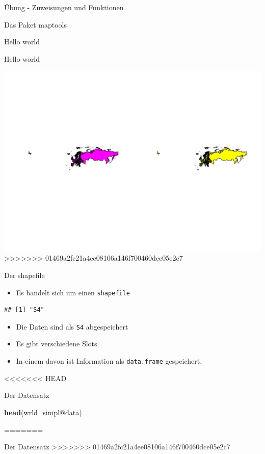 \documentclass[ignorenonframetext,]{beamer}
\newenvironment{Shaded}{\begin{snugshade}}{\end{snugshade}}
\newcommand{\KeywordTok}[1]{\textcolor[rgb]{0.26,0.66,0.93}{\textbf{#1}}}
\newcommand{\NormalTok}[1]{\textcolor[rgb]{0.74,0.68,0.62}{#1}}
\newcommand{\OperatorTok}[1]{\textcolor[rgb]{0.74,0.68,0.62}{#1}}
\providecommand{\tightlist}{%
  \setlength{\itemsep}{0pt}\setlength{\parskip}{0pt}}
\begin{document}
\begin{frame}[fragile]{Übung - Zuweisungen und Funktionen}
\begin{frame}[fragile]{Das Paket maptools}
\begin{frame}[fragile]{Hello world}
\begin{frame}{Hello world}

\includegraphics{Geomedizin_files/figure-beamer/unnamed-chunk-83-1.pdf}
>>>>>>> 01469a2fc21a4ee08106a146f700460dce05e2c7

\end{frame}

\begin{frame}[fragile]{Der shapefile}
\protect\hypertarget{der-shapefile}{}

\begin{itemize}
\tightlist
\item
  Es handelt sich um einen \texttt{shapefile}
\end{itemize}

\begin{verbatim}
## [1] "S4"
\end{verbatim}

\begin{itemize}
\tightlist
\item
  Die Daten sind als \texttt{S4} abgespeichert
\item
  Es gibt verschiedene Slots
\item
  In einem davon ist Information als \texttt{data.frame} gespeichert.
\end{itemize}

\end{frame}

<<<<<<< HEAD
\begin{frame}[fragile]{Der Datensatz}
\protect\hypertarget{der-datensatz}{}

\begin{Shaded}
\begin{Highlighting}[]
\KeywordTok{head}\NormalTok{(wrld_simpl}\OperatorTok{@}\NormalTok{data)}
\end{Highlighting}
\end{Shaded}
=======
\begin{frame}{Der Datensatz}
>>>>>>> 01469a2fc21a4ee08106a146f700460dce05e2c7


\end{frame}
\end{frame}
\end{frame}
\end{frame}
\end{frame}
\end{document}
